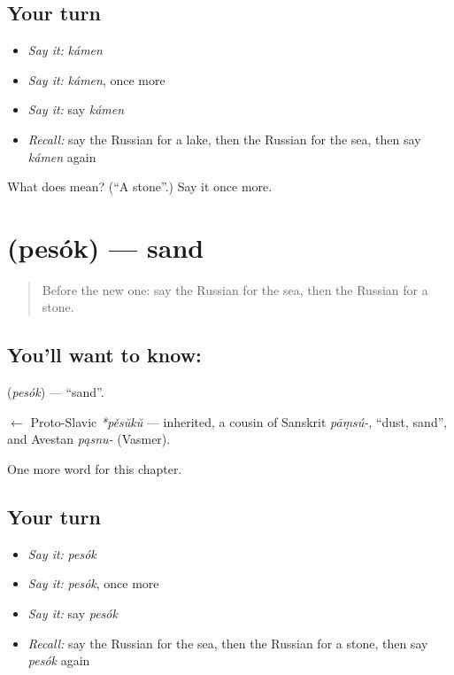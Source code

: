 \subsection*{Your turn}
\begin{itemize}
\raggedright
  \item \emph{Say it:} \emph{kámen}
  \item \emph{Say it:} \emph{kámen}, once more
  \item \emph{Say it:} say \emph{kámen}
  \item \emph{Recall:} say the Russian for a lake, then the Russian for the sea, then say \emph{kámen} again
\end{itemize}

\begin{tcolorbox}[breakable,colback=teal!4,colframe=teal!35!black,title={Before you move on}]
What does  mean? (\textquotedblleft{}A stone\textquotedblright{}.) Say it once more.
\end{tcolorbox}
\section[\texorpdfstring{\ru{песок} (pesók)}{песок (pesók)}]{ (pesók) — sand}

\label{lesson:RU-C57-sand}



\begin{quote}
Before the new one: say the Russian for the sea, then the Russian for a stone.
\end{quote}

\subsection*{You'll want to know: }
\textbf{} (\emph{pesók}) — \textquotedblleft{}sand\textquotedblright{}.

\begin{cousinweb}
\textbf{} $\leftarrow$ Proto-Slavic \emph{*pěsŭkŭ} — inherited, a cousin of Sanskrit \emph{pāṃsú-}, \textquotedblleft{}dust, sand\textquotedblright{}, and Avestan \emph{pąsnu-} (Vasmer).
\end{cousinweb}

\begin{grammarlens}[title={What you've built}]
One more word for this chapter.
\end{grammarlens}

\subsection*{Your turn}
\begin{itemize}
\raggedright
  \item \emph{Say it:} \emph{pesók}
  \item \emph{Say it:} \emph{pesók}, once more
  \item \emph{Say it:} say \emph{pesók}
  \item \emph{Recall:} say the Russian for the sea, then the Russian for a stone, then say \emph{pesók} again
\end{itemize}


